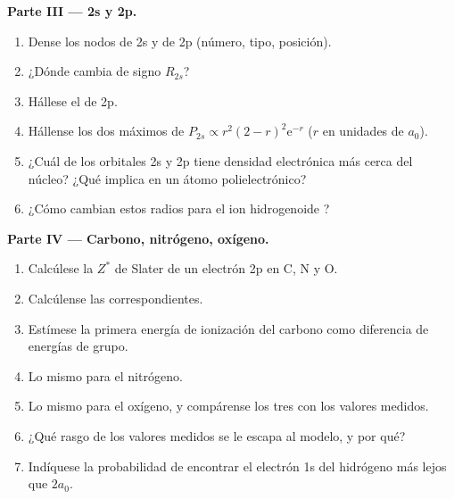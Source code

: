 \begin{problem}
\medskip
\noindent\textbf{Parte III --- 2s y 2p.}
\begin{enumerate}[resume]
  \item Dense los nodos de 2s y de 2p (número, tipo, posición).
  \item ¿Dónde cambia de signo $R_{2s}$?
  \item Hállese el  de 2p.
  \item Hállense los dos máximos de $P_{2s} \propto r^2(2 - r)^2\mathrm e^{-r}$ ($r$ en unidades de
        $a_0$).
  \item ¿Cuál de los orbitales 2s y 2p tiene densidad electrónica más cerca del núcleo? ¿Qué
        implica en un átomo polielectrónico?
  \item ¿Cómo cambian estos radios para el ion hidrogenoide ?
\end{enumerate}

\medskip
\noindent\textbf{Parte IV --- Carbono, nitrógeno, oxígeno.}
\begin{enumerate}[resume]
  \item Calcúlese la $Z^*$ de Slater de un electrón 2p en C, N y O.
  \item Calcúlense las  correspondientes.
  \item Estímese la primera energía de ionización del carbono como diferencia de energías
        de grupo.
  \item Lo mismo para el nitrógeno.
  \item Lo mismo para el oxígeno, y compárense los tres con los valores medidos.
  \item ¿Qué rasgo de los valores medidos se le escapa al modelo, y por qué?
  \item Indíquese la probabilidad de encontrar el electrón 1s del hidrógeno más lejos
        que $2a_0$.
\end{enumerate}
\end{problem}

